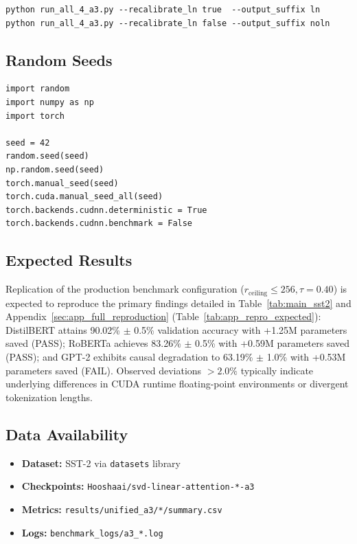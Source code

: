 \begin{lstlisting}
python run_all_4_a3.py --recalibrate_ln true  --output_suffix ln
python run_all_4_a3.py --recalibrate_ln false --output_suffix noln
\end{lstlisting}

\subsection{Random Seeds}

\begin{lstlisting}
import random
import numpy as np
import torch

seed = 42
random.seed(seed)
np.random.seed(seed)
torch.manual_seed(seed)
torch.cuda.manual_seed_all(seed)
torch.backends.cudnn.deterministic = True
torch.backends.cudnn.benchmark = False
\end{lstlisting}

\subsection{Expected Results}

Replication of the production benchmark configuration ($r_{\mathrm{ceiling}} \le 256, \tau=0.40$) is expected to reproduce the primary findings detailed in Table~\ref{tab:main_sst2} and Appendix~\ref{sec:app_full_reproduction} (Table~\ref{tab:app_repro_expected}): DistilBERT attains 90.02\% $\pm$ 0.5\% validation accuracy with +1.25M parameters saved (PASS); RoBERTa achieves 83.26\% $\pm$ 0.5\% with +0.59M parameters saved (PASS); and GPT-2 exhibits causal degradation to 63.19\% $\pm$ 1.0\% with +0.53M parameters saved (FAIL). Observed deviations $>2.0\%$ typically indicate underlying differences in CUDA runtime floating-point environments or divergent tokenization lengths.

\subsection{Data Availability}

\begin{itemize}
\item \textbf{Dataset:} SST-2 via \texttt{datasets} library
\item \textbf{Checkpoints:} \texttt{Hooshaai/svd-linear-attention-*-a3}
\item \textbf{Metrics:} \texttt{results/unified\_a3/*/summary.csv}
\item \textbf{Logs:} \texttt{benchmark\_logs/a3\_*.log}

\end{itemize}
